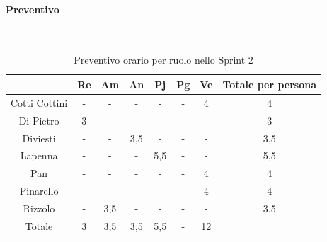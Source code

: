 \documentclass{article}
\begin{document}
                \paragraph{Preventivo}\mbox{}\\
                \begin{table}[H]
                    \centering
                    \begin{tabular}{|c|c|c|c|c|c|c|c|}
                    \hline
                                  & Re  & Am  & An  & Pj  & Pg  & Ve  & Totale per persona \\ \hline
                    Cotti Cottini & -   & -   & -   & -   & -   & 4   & 4                  \\ \hline
                    Di Pietro     & 3   & -   & -   & -   & -   & -   & 3                  \\ \hline
                    Diviesti      & -   & -   & 3,5 & -   & -   & -   & 3,5                \\ \hline
                    Lapenna       & -   & -   & -   & 5,5 & -   & -   & 5,5                \\ \hline
                    Pan           & -   & -   & -   & -   & -   & 4   & 4                  \\ \hline
                    Pinarello     & -   & -   & -   & -   & -  & 4   & 4                 \\ \hline
                    Rizzolo       & -   & 3,5 & -   & -   & -   & -   & 3,5                \\ \hline
                    Totale        & 3   & 3,5 & 3,5 & 5,5 & -  & 12  &                    \\ \hline
                    \end{tabular}
                    \caption{Preventivo orario per ruolo nello Sprint 2}
                \end{table}

\end{document}
